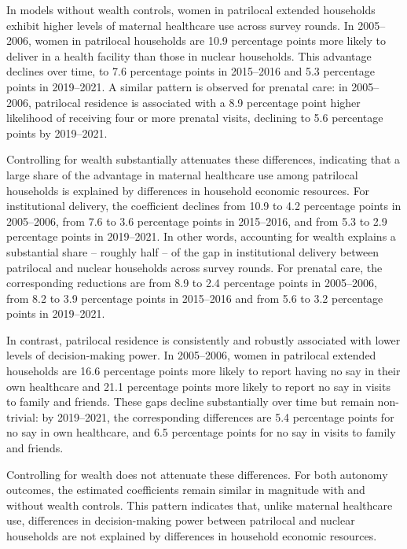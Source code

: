 \documentclass[10pt,twoside,reqno]{article}
\begin{document}
In models without wealth controls, women in patrilocal extended households exhibit higher levels of maternal healthcare use across survey rounds. In 2005–2006, women in patrilocal households are 10.9 percentage points more likely to deliver in a health facility than those in nuclear households. This advantage declines over time, to 7.6 percentage points in 2015–2016 and 5.3 percentage points in 2019–2021. A similar pattern is observed for prenatal care: in 2005–2006, patrilocal residence is associated with a 8.9 percentage point higher likelihood of receiving four or more prenatal visits, declining to 5.6 percentage points by 2019–2021.

Controlling for wealth substantially attenuates these differences, indicating that a large share of the advantage in maternal healthcare use among patrilocal households is explained by differences in household economic resources. For institutional delivery, the coefficient declines from 10.9 to 4.2 percentage points in 2005–2006, from 7.6 to 3.6 percentage points in 2015–2016, and from 5.3 to 2.9 percentage points in 2019–2021. In other words, accounting for wealth explains a substantial share – roughly half – of the gap in institutional delivery between patrilocal and nuclear households across survey rounds. For prenatal care, the corresponding reductions are from 8.9 to 2.4 percentage points in 2005–2006, from 8.2 to 3.9 percentage points in 2015–2016 and from 5.6 to 3.2 percentage points in 2019–2021.

In contrast, patrilocal residence is consistently and robustly associated with lower levels of decision-making power. In 2005–2006, women in patrilocal extended households are 16.6 percentage points more likely to report having no say in their own healthcare and 21.1 percentage points more likely to report no say in visits to family and friends. These gaps decline substantially over time but remain non-trivial: by 2019–2021, the corresponding differences are 5.4 percentage points for no say in own healthcare, and 6.5 percentage points for no say in visits to family and friends. 

Controlling for wealth does not attenuate these differences. For both autonomy outcomes, the estimated coefficients remain similar in magnitude with and without wealth controls. This pattern indicates that, unlike maternal healthcare use, differences in decision-making power between patrilocal and nuclear households are not explained by differences in household economic resources.
\end{document}
